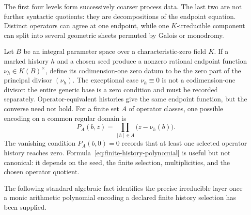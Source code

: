 The first four levels form successively coarser process data.  The last two are
not further syntactic quotients: they are decompositions of the endpoint equation.
Distinct operators can agree at one endpoint, while one $K$-irreducible component
can split into several geometric sheets permuted by Galois or monodromy.

Let $B$ be an integral parameter space over a characteristic-zero field $K$.  If
a marked history $h$ and a chosen seed produce a nonzero rational endpoint function
$\nu_h\in K(B)^\times$, define its codimension-one zero datum to be the zero part
of the principal divisor $(\nu_h)$.  The exceptional case $\nu_h\equiv0$ is not a
codimension-one divisor: the entire generic base is a zero condition and must be
recorded separately.  Operator-equivalent histories give the same endpoint
function, but the converse need not hold.  For a finite set $A$ of operator
classes, one possible encoding on a common regular domain is
\begin{equation}
 P_A(b,z)=\prod_{[h]\in A}\bigl(z-\nu_h(b)\bigr).
 \label{eq:finite-history-polynomial}
\end{equation}
The vanishing condition $P_A(b,0)=0$ records that at least one selected operator
history reaches zero.  Formula~\eqref{eq:finite-history-polynomial} is useful but not
canonical: it depends on the seed, the finite selection, multiplicities, and the
chosen operator quotient.

The following standard algebraic fact identifies the precise irreducible layer
once a monic arithmetic polynomial encoding a declared finite history selection
has been supplied.

